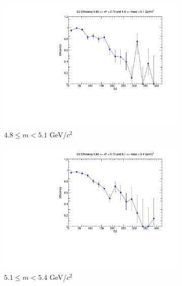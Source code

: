 \documentclass[11pt]{article}
\begin{document}
\begin{figure}[p]
\begin{subfigure}[b]{0.32\textwidth}
        \includegraphics[width=\textwidth]{./kTrackerEfficiencyPlots/D2_Efficiency_xF13_mass2.pdf}
        \caption{$4.8 \leq m < 5.1$ GeV/$c^2$}
    \end{subfigure}\vspace{0.5cm}
    \begin{subfigure}[b]{0.32\textwidth}
        \centering
        \includegraphics[width=\textwidth]{./kTrackerEfficiencyPlots/D2_Efficiency_xF13_mass3.pdf}
        \caption{$5.1 \leq m < 5.4$ GeV/$c^2$}
    \end{subfigure}\hfill
    \begin{subfigure}[b]{0.32\textwidth}
        \centering

\end{subfigure}
\end{figure}
\end{document}
